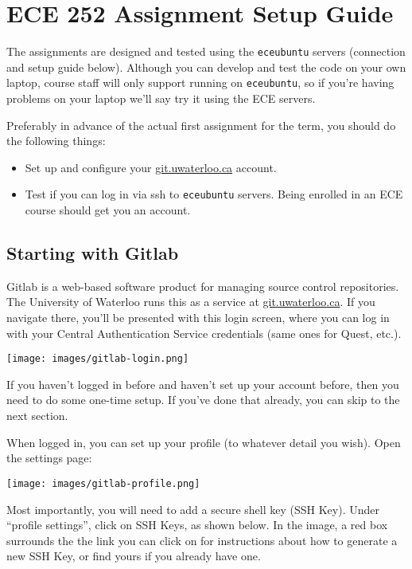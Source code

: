 



\section*{ECE 252 Assignment Setup Guide}

The assignments are designed and tested using the \texttt{eceubuntu} servers (connection and setup guide below). Although you can develop and test the code on your own laptop, course staff will only support running on \texttt{eceubuntu}, so if you're having problems on your laptop we'll say try it using the ECE servers.

Preferably in advance of the actual first assignment for the term, you should do the following things:
\begin{itemize}
	\item Set up and configure your \url{git.uwaterloo.ca} account.
	\item Test if you can log in via ssh to \texttt{eceubuntu} servers. Being enrolled in an ECE course should get you an account.
\end{itemize}

\subsection*{Starting with Gitlab}
Gitlab is a web-based software product for managing source control repositories. The University of Waterloo runs this as a service at \url{git.uwaterloo.ca}. If you navigate there, you'll be presented with this login screen, where you can log in with your Central Authentication Service credentials (same ones for Quest, etc.).

\begin{center}
	\texttt{[image: images/gitlab-login.png]}
\end{center}

If you haven't logged in before and haven't set up your account before, then you need to do some one-time setup. If you've done that already, you can skip to the next section.


When logged in, you can set up your profile (to whatever detail you wish). Open the settings page:

\begin{center}
	\texttt{[image: images/gitlab-profile.png]}
\end{center}


Most importantly, you will need to add a secure shell key (SSH Key). Under ``profile settings'', click on SSH Keys, as shown below. In the image, a red box surrounds the the link you can click on for instructions about how to generate a new SSH Key, or find yours if you already have one. 
 
